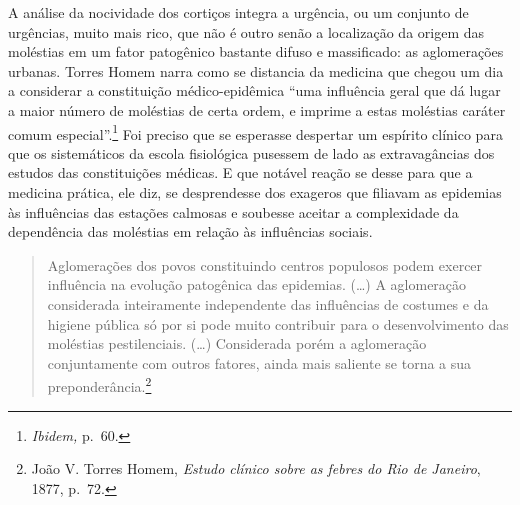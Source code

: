 A análise da nocividade dos cortiços integra a urgência, ou um conjunto
de urgências, muito mais rico, que não é outro senão a localização da
origem das moléstias em um fator patogênico bastante difuso e
massificado: as aglomerações urbanas. Torres Homem narra como se
distancia da medicina que chegou um dia a considerar a constituição
médico-epidêmica ``uma influência geral que dá lugar a maior número de
moléstias de certa ordem, e imprime a estas moléstias caráter comum
especial''.\footnote{\textit{Ibidem,} p.~60.} Foi preciso que se esperasse
despertar um espírito clínico para que os sistemáticos da escola
fisiológica pusessem de lado as extravagâncias dos estudos das
constituições médicas. E que notável reação se desse para que a medicina
prática, ele diz, se desprendesse dos exageros que filiavam as epidemias
às influências das estações calmosas e soubesse aceitar a complexidade
da dependência das moléstias em relação às influências sociais.

\begin{quote}
Aglomerações dos povos constituindo centros populosos podem exercer
influência na evolução patogênica das epidemias. (\ldots{}) A
aglomeração considerada inteiramente independente das influências de
costumes e da higiene pública só por si pode muito contribuir para o
desenvolvimento das moléstias pestilenciais. (\ldots{}) Considerada
porém a aglomeração conjuntamente com outros fatores, ainda mais
saliente se torna a sua preponderância.\footnote{João V. Torres Homem,
  \textit{Estudo clínico sobre as febres do Rio de Janeiro}, 1877, p.~72.}
\end{quote}

